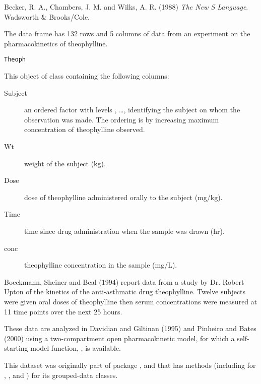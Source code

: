 %
\begin{References}\relax
Becker, R. A., Chambers, J. M. and Wilks, A. R. (1988)
\emph{The New S Language}.
Wadsworth \& Brooks/Cole.
\end{References}
%
\begin{Examples}
\end{Examples}
%
\begin{Description}\relax
The  data frame has 132 rows and 5 columns of data from
an experiment on the pharmacokinetics of theophylline.
\end{Description}
%
\begin{Usage}
\begin{verbatim}
Theoph
\end{verbatim}
\end{Usage}
%
\begin{Format}
This object of class  containing the following columns:
\begin{description}

\item[Subject] 
an ordered factor with levels , \dots, 
identifying the subject on whom the observation was made.  The
ordering is by increasing maximum concentration of theophylline
observed.

\item[Wt] 
weight of the subject (kg).

\item[Dose] 
dose of theophylline administered orally to the subject (mg/kg).

\item[Time] 
time since drug administration when the sample was drawn (hr).

\item[conc] 
theophylline concentration in the sample (mg/L).


\end{description}

\end{Format}
%
\begin{Details}\relax
Boeckmann, Sheiner and Beal (1994) report data from a study by
Dr. Robert Upton of the kinetics of the anti-asthmatic drug
theophylline.  Twelve subjects were given oral doses of theophylline
then serum concentrations were measured at 11 time points over the
next 25 hours.

These data are analyzed in Davidian and Giltinan (1995) and Pinheiro
and Bates (2000) using a two-compartment open pharmacokinetic model,
for which a self-starting model function, , is available.

This dataset was originally part of package , and that has
methods (including for \code{[}, ,  and
) for its grouped-data classes. 
\end{Details}
